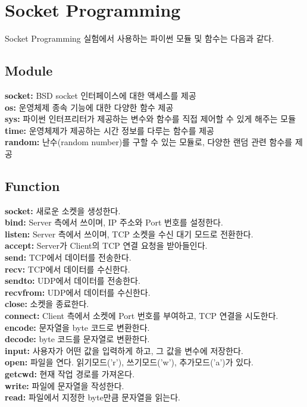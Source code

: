 \section{Socket Programming}
Socket Programming 실험에서 사용하는 파이썬 모듈 및 함수는 다음과 같다.
\subsection{Module}
    \textbf{socket:} BSD socket 인터페이스에 대한 액세스를 제공 \\
    \textbf{os:} 운영체제 종속 기능에 대한 다양한 함수 제공 \\
    \textbf{sys:} 파이썬 인터프리터가 제공하는 변수와 함수를 직접 제어할 수 있게 해주는 모듈 \\
    \textbf{time:} 운영체제가 제공하는 시간 정보를 다루는 함수를 제공 \\
    \textbf{random:} 난수(random number)를 구할 수 있는 모듈로, 다양한 랜덤 관련 함수를 제공 \\
\subsection{Function}
    \textbf{socket:} 새로운 소켓을 생성한다. \\
    \textbf{bind:} Server 측에서 쓰이며, IP 주소와 Port 번호를 설정한다. \\
    \textbf{listen:} Server 측에서 쓰이며, TCP 소켓을 수신 대기 모드로 전환한다. \\
    \textbf{accept:} Server가 Client의 TCP 연결 요청을 받아들인다. \\
    \textbf{send:} TCP에서 데이터를 전송한다. \\
    \textbf{recv:} TCP에서 데이터를 수신한다. \\
    \textbf{sendto:} UDP에서 데이터를 전송한다. \\
    \textbf{recvfrom:} UDP에서 데이터를 수신한다. \\
    \textbf{close:} 소켓을 종료한다. \\
    \textbf{connect:} Client 측에서 소켓에 Port 번호를 부여하고, TCP 연결을 시도한다. \\
    \textbf{encode:} 문자열을 byte 코드로 변환한다. \\
    \textbf{decode:} byte 코드를 문자열로 변환한다. \\
    \textbf{input:} 사용자가 어떤 값을 입력하게 하고, 그 값을 변수에 저장한다. \\
    \textbf{open:} 파일을 연다. 읽기모드(’r’), 쓰기모드(’w’), 추가모드(’a’)가 있다. \\
    \textbf{getcwd:} 현재 작업 경로를 가져온다. \\
    \textbf{write:} 파일에 문자열을 작성한다. \\
    \textbf{read:} 파일에서 지정한 byte만큼 문자열을 읽는다. \\
\newpage